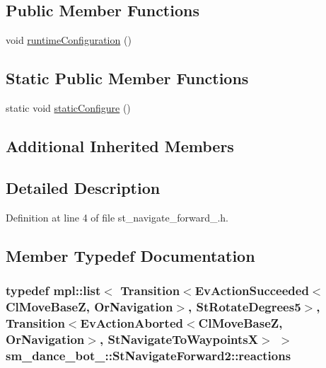 \subsection*{Public Member Functions}
\begin{DoxyCompactItemize}
\item 
void \hyperlink{structsm__dance__bot__3_1_1StNavigateForward2_aa320b7e967f34c6b3f39903d316d2399}{runtime\+Configuration} ()
\end{DoxyCompactItemize}
\subsection*{Static Public Member Functions}
\begin{DoxyCompactItemize}
\item 
static void \hyperlink{structsm__dance__bot__3_1_1StNavigateForward2_a91b549d61f30bd3110c64adaf1968fc3}{static\+Configure} ()
\end{DoxyCompactItemize}
\subsection*{Additional Inherited Members}


\subsection{Detailed Description}


Definition at line 4 of file st\+\_\+navigate\+\_\+forward\+\_.\+h.



\subsection{Member Typedef Documentation}
\subsubsection[{\texorpdfstring{reactions}{reactions}}]{\setlength{\rightskip}{0pt plus 5cm}typedef mpl\+::list$<$ Transition$<$Ev\+Action\+Succeeded$<${\bf Cl\+Move\+BaseZ}, {\bf Or\+Navigation}$>$, {\bf St\+Rotate\+Degrees5}$>$, Transition$<$Ev\+Action\+Aborted$<${\bf Cl\+Move\+BaseZ}, {\bf Or\+Navigation}$>$, {\bf St\+Navigate\+To\+WaypointsX}$>$ $>$ {\bf sm\+\_\+dance\+\_\+bot\+\_\+::\+St\+Navigate\+Forward2\+::reactions}}\hypertarget{structsm__dance__bot__3_1_1StNavigateForward2_a3b94719f33fff52840cf5f577695194b}{}\label{structsm__dance__bot__3_1_1StNavigateForward2_a3b94719f33fff52840cf5f577695194b}


